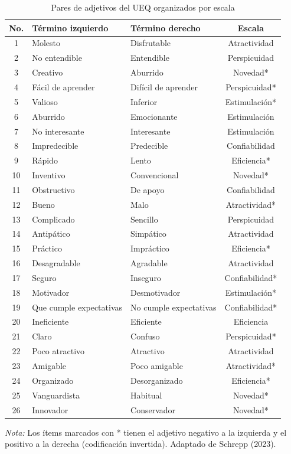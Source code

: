 \documentclass[a4paper,12pt]{report}
\begin{document}
\begin{table}[H]
    \centering
    \scriptsize
    \caption{Pares de adjetivos del UEQ organizados por escala}
    \label{tab:ueq_items}
    \begin{tabular}{c p{5cm} p{5cm} c}
        \toprule
        \textbf{No.} & \textbf{Término izquierdo} & \textbf{Término derecho} & \textbf{Escala} \\
        \midrule
        1 & Molesto & Disfrutable & Atractividad \\
        2 & No entendible & Entendible & Perspicuidad \\
        3 & Creativo & Aburrido & Novedad* \\
        4 & Fácil de aprender & Difícil de aprender & Perspicuidad* \\
        5 & Valioso & Inferior & Estimulación* \\
        6 & Aburrido & Emocionante & Estimulación \\
        7 & No interesante & Interesante & Estimulación \\
        8 & Impredecible & Predecible & Confiabilidad \\
        9 & Rápido & Lento & Eficiencia* \\
        10 & Inventivo & Convencional & Novedad* \\
        11 & Obstructivo & De apoyo & Confiabilidad \\
        12 & Bueno & Malo & Atractividad* \\
        13 & Complicado & Sencillo & Perspicuidad \\
        14 & Antipático & Simpático & Atractividad \\
        15 & Práctico & Impráctico & Eficiencia* \\
        16 & Desagradable & Agradable & Atractividad \\
        17 & Seguro & Inseguro & Confiabilidad* \\
        18 & Motivador & Desmotivador & Estimulación* \\
        19 & Que cumple expectativas & No cumple expectativas & Confiabilidad* \\
        20 & Ineficiente & Eficiente & Eficiencia \\
        21 & Claro & Confuso & Perspicuidad* \\
        22 & Poco atractivo & Atractivo & Atractividad \\
        23 & Amigable & Poco amigable & Atractividad* \\
        24 & Organizado & Desorganizado & Eficiencia* \\
        25 & Vanguardista & Habitual & Novedad* \\
        26 & Innovador & Conservador & Novedad* \\
        \bottomrule
    \end{tabular}
    \vspace{0.2cm}
    \par\noindent\footnotesize\textit{Nota:} Los ítems marcados con * tienen el adjetivo negativo a la izquierda y el positivo a la derecha (codificación invertida). Adaptado de Schrepp (2023).
\end{table}
\end{document}
